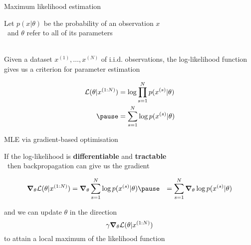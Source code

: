 \documentclass[14pt]{beamer}
\begin{document}
\begin{frame}{Maximum likelihood estimation}

Let $p(x|\theta)$ be the probability of an observation $x$\\
~and $\theta$ refer to all of its parameters \\

~ \pause

Given a dataset $x^{(1)}, \ldots, x^{(N)}$ of i.i.d. observations, \pause
the log-likelihood function gives us a criterion for parameter estimation

\begin{equation*}
\begin{aligned}
\mathcal L(\theta|x^{(1:N)}) &= \log \prod_{s=1}^N p(x^{(s)}|\theta) \\ \pause
 &= \sum_{s=1}^N \log p(x^{(s)}|\theta)
\end{aligned}
\end{equation*} 


\end{frame}

\begin{frame}{MLE via gradient-based optimisation}

If the log-likelihood is {\bf differentiable} and  {\bf tractable}\\
~then backpropagation can give us the gradient
\begin{small}
\begin{equation*}
\begin{aligned}
\grad_\theta \mathcal L(\theta|x^{(1:N)}) &= \grad_\theta \sum_{s=1}^N \log p(x^{(s)}|\theta) \pause
 &=  \sum_{s=1}^N \grad_\theta \log p(x^{(s)}|\theta)
\end{aligned}
\end{equation*}
\end{small}  \pause

and we can update $\theta$ in the direction
\begin{equation*}
\gamma \grad_\theta \mathcal L(\theta|x^{(1:N)})
\end{equation*}
to attain a local maximum of the likelihood function

\end{frame}
\end{document}
